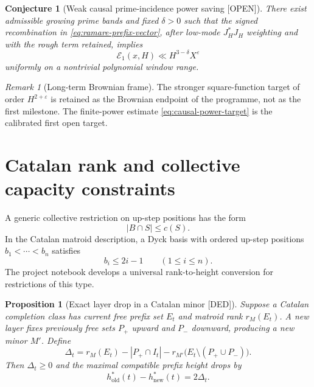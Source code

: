 \documentclass[11pt]{amsart}
\numberwithin{equation}{section}
\theoremstyle{plain}
\newtheorem{proposition}[theorem]{Proposition}
\newtheorem{conjecture}[theorem]{Conjecture}
\theoremstyle{definition}
\theoremstyle{remark}
\newtheorem{remark}[theorem]{Remark}
\newcommand{\eps}{\varepsilon}
\newcommand{\DED}{\textup{[DED]}}
\newcommand{\OPEN}{\textup{[OPEN]}}
\begin{document}
\begin{conjecture}[Weak causal prime-incidence power saving \OPEN]
\label{conj:weak-causal-frame}
There exist admissible growing prime bands and fixed $\delta>0$ such that the signed recombination in
\eqref{eq:ramare-prefix-vector}, after low-mode $J_H^*J_H$ weighting and with the rough term retained, implies
\begin{equation}
\mathcal E_1(x,H)\ll H^{3-\delta}X^\eps
\label{eq:causal-power-target}
\end{equation}
uniformly on a nontrivial polynomial window range.
\end{conjecture}

\begin{remark}[Long-term Brownian frame]
\label{rem:brownian-frame}
The stronger square-function target of order $H^{2+\eps}$ is retained as the Brownian endpoint of the programme, not as the
first milestone.  The finite-power estimate \eqref{eq:causal-power-target} is the calibrated first open target.
\end{remark}

\section{Catalan rank and collective capacity constraints}
\label{sec:catalan-rank}

A generic collective restriction on up-step positions has the form
\begin{equation}
|B\cap S|\le c(S).
\label{eq:generic-capacity}
\end{equation}
In the Catalan matroid description, a Dyck basis with ordered up-step positions $b_1<\cdots<b_n$ satisfies
\begin{equation}
b_i\le2i-1
\qquad(1\le i\le n).
\label{eq:catalan-basis-criterion}
\end{equation}
The project notebook develops a universal rank-to-height conversion for restrictions of this type.

\begin{proposition}[Exact layer drop in a Catalan minor \DED]
\label{prop:layer-drop}
Suppose a Catalan completion class has current free prefix set $E_t$ and matroid rank $r_M(E_t)$.  A new layer fixes previously
free sets $P_+$ upward and $P_-$ downward, producing a new minor $M'$.  Define
\begin{equation}
\Delta_t
=
r_M(E_t)-|P_+\cap I_t|
-r_{M'}\bigl(E_t\setminus(P_+\cup P_-)\bigr).
\label{eq:rank-deficit}
\end{equation}
Then $\Delta_t\ge0$ and the maximal compatible prefix height drops by
\begin{equation}
h^*_{\mathrm{old}}(t)-h^*_{\mathrm{new}}(t)=2\Delta_t.
\label{eq:exact-layer-drop}
\end{equation}
\end{proposition}
\end{document}
